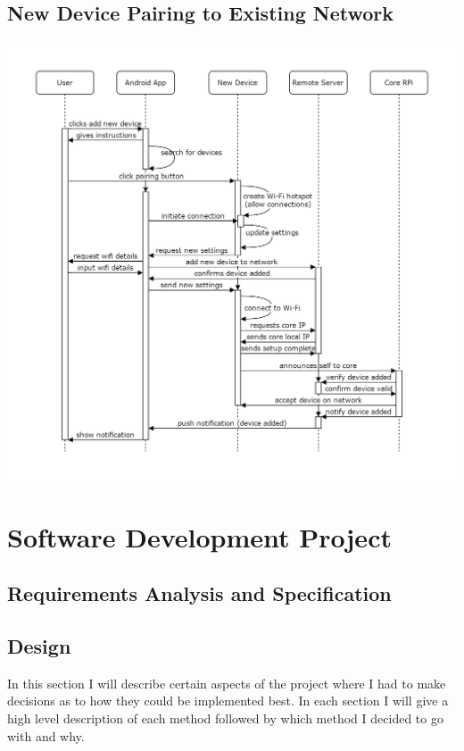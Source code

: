 \subsection{New Device Pairing to Existing Network}
\begin{center}
	\includegraphics[width=\textwidth,height=\textheight,keepaspectratio]{"Graphics/New Device Pairing to Network"}
\end{center}

\newpage
\section{Software Development Project}

\subsection{Requirements Analysis and Specification}

\subsection{Design}
In this section I will describe certain aspects of the project where I had to make decisions as to how they could be implemented best. In each section I will give a high level description of each method followed by which method I decided to go with and why.

